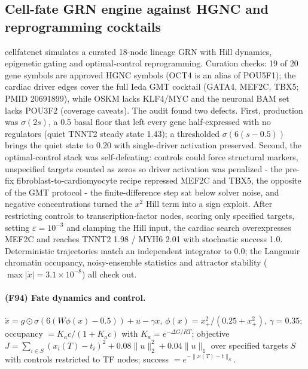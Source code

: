 \subsection{Cell-fate GRN engine against HGNC and reprogramming cocktails}
cellfatenet simulates a curated 18-node lineage GRN with Hill dynamics, epigenetic gating and optimal-control reprogramming. Curation checks: 19 of 20 gene symbols are approved HGNC symbols (OCT4 is an alias of POU5F1); the cardiac driver edges cover the full Ieda GMT cocktail (GATA4, MEF2C, TBX5; PMID 20691899), while OSKM lacks KLF4/MYC and the neuronal BAM set lacks POU3F2 (coverage caveats). The audit found two defects. First, production was $\sigma(2s)$, a 0.5 basal floor that left every gene half-expressed with no regulators (quiet TNNT2 steady state 1.43); a thresholded $\sigma(6(s-0.5))$ brings the quiet state to 0.20 with single-driver activation preserved. Second, the optimal-control stack was self-defeating: controls could force structural markers, unspecified targets counted as zeros so driver activation was penalized - the pre-fix fibroblast-to-cardiomyocyte recipe repressed MEF2C and TBX5, the opposite of the GMT protocol - the finite-difference step sat below solver noise, and negative concentrations turned the $x^2$ Hill term into a sign exploit. After restricting controls to transcription-factor nodes, scoring only specified targets, setting $\varepsilon=10^{-3}$ and clamping the Hill input, the cardiac search overexpresses MEF2C and reaches TNNT2 1.98 / MYH6 2.01 with stochastic success 1.0. Deterministic trajectories match an independent integrator to 0.0; the Langmuir chromatin occupancy, noisy-ensemble statistics and attractor stability ($\max|\dot x|=3.1\times10^{-8}$) all check out.
\paragraph{(F94) Fate dynamics and control.} $\dot x=g\odot\sigma(6(W\phi(x)-0.5))+u-\gamma x$, $\phi(x)=x_+^2/(0.25+x_+^2)$, $\gamma=0.35$; occupancy $=K_a c/(1+K_a c)$ with $K_a=e^{-\Delta G/RT}$; objective $J=\sum_{i\in S}(x_i(T)-t_i)^2+0.08\|u\|_2^2+0.04\|u\|_1$ over specified targets $S$ with controls restricted to TF nodes; success $=e^{-\|x(T)-t\|_S}$.
